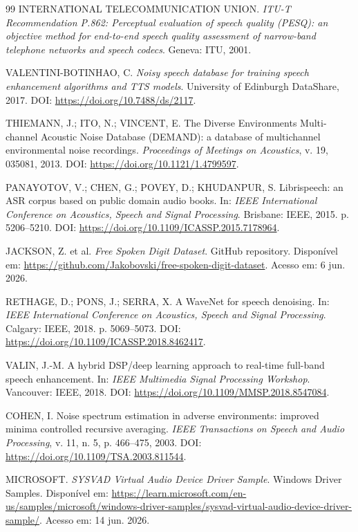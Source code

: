 \begin{thebibliography}{99}
 INTERNATIONAL TELECOMMUNICATION UNION. \textit{ITU-T Recommendation P.862: Perceptual evaluation of speech quality (PESQ): an objective method for end-to-end speech quality assessment of narrow-band telephone networks and speech codecs}. Geneva: ITU, 2001.

 VALENTINI-BOTINHAO, C. \textit{Noisy speech database for training speech enhancement algorithms and TTS models}. University of Edinburgh DataShare, 2017. DOI: \url{https://doi.org/10.7488/ds/2117}.

 THIEMANN, J.; ITO, N.; VINCENT, E. The Diverse Environments Multi-channel Acoustic Noise Database (DEMAND): a database of multichannel environmental noise recordings. \textit{Proceedings of Meetings on Acoustics}, v. 19, 035081, 2013. DOI: \url{https://doi.org/10.1121/1.4799597}.

 PANAYOTOV, V.; CHEN, G.; POVEY, D.; KHUDANPUR, S. Librispeech: an ASR corpus based on public domain audio books. In: \textit{IEEE International Conference on Acoustics, Speech and Signal Processing}. Brisbane: IEEE, 2015. p. 5206--5210. DOI: \url{https://doi.org/10.1109/ICASSP.2015.7178964}.

 JACKSON, Z. et al. \textit{Free Spoken Digit Dataset}. GitHub repository. Disponível em: \url{https://github.com/Jakobovski/free-spoken-digit-dataset}. Acesso em: 6 jun. 2026.

 RETHAGE, D.; PONS, J.; SERRA, X. A WaveNet for speech denoising. In: \textit{IEEE International Conference on Acoustics, Speech and Signal Processing}. Calgary: IEEE, 2018. p. 5069--5073. DOI: \url{https://doi.org/10.1109/ICASSP.2018.8462417}.

 VALIN, J.-M. A hybrid DSP/deep learning approach to real-time full-band speech enhancement. In: \textit{IEEE Multimedia Signal Processing Workshop}. Vancouver: IEEE, 2018. DOI: \url{https://doi.org/10.1109/MMSP.2018.8547084}.

 COHEN, I. Noise spectrum estimation in adverse environments: improved minima controlled recursive averaging. \textit{IEEE Transactions on Speech and Audio Processing}, v. 11, n. 5, p. 466--475, 2003. DOI: \url{https://doi.org/10.1109/TSA.2003.811544}.

 MICROSOFT. \textit{SYSVAD Virtual Audio Device Driver Sample}. Windows Driver Samples. Disponível em: \url{https://learn.microsoft.com/en-us/samples/microsoft/windows-driver-samples/sysvad-virtual-audio-device-driver-sample/}. Acesso em: 14 jun. 2026.


\end{thebibliography}
